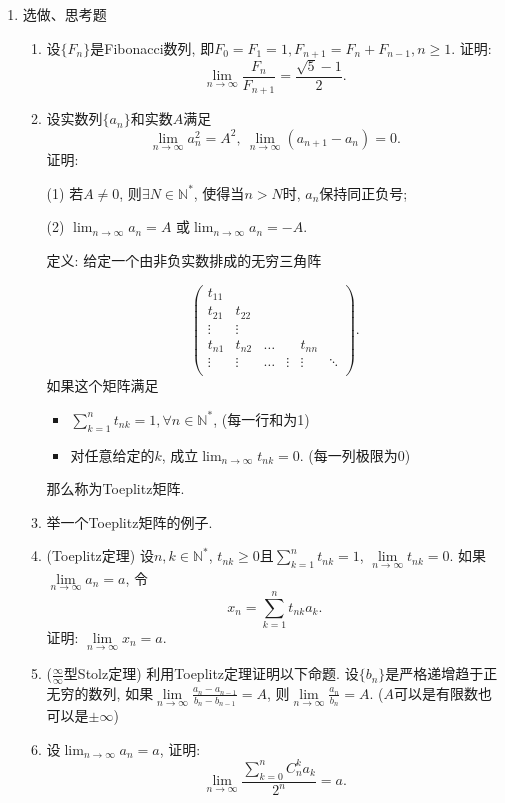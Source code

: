 \documentclass[UTF8,11pt, a4paper, oneside, fontset=none]{ctexbook}
\begin{document}
\begin{enumerate}
\item {\color{red} 选做、思考题}

\begin{enumerate}

\item 设$\{ F_n\}$是Fibonacci数列, 即$F_0 = F_1 =1, F_{n+1} = F_n + F_{n-1}, n \geq 1$. 证明: 
\[
\lim_{n \to \infty} \frac{F_n}{F_{n+1}} = \frac{\sqrt 5 -1}{2}.
\]

\item 设实数列$\{a_n\}$和实数$A$满足
\[
\lim_{n \to \infty} a_n^2 = A^2, \ \lim_{n \to \infty}(a_{n+1} - a_n) =0.
\]
证明: 

(1) 若$A \neq 0$, 则$\exists N \in \mathbb N^*$, 使得当$n >N$时, $a_n$保持同正负号;

(2) $\lim_{n \to \infty} a_n = A$ 或$\lim_{n \to \infty} a_n = -A$.

\noindent
{\color{purple} 定义}: 给定一个由非负实数排成的无穷三角阵

\[
\left( \begin{array}{ccccccc}
t_{11}      &  & & & &    \\
t_{21}      &t_{22} &  &  &   \\
\vdots      & \vdots     & &  &  &   \\
t_{n1}     & t_{n2}      & \hdots        &    & t_{nn} &    \\
\vdots & \vdots & \hdots       & \vdots       & \vdots   & \ddots  \\
\end{array} \right). 
\]
如果这个矩阵满足
\begin{itemize}
\item[(1)] $\sum_{k=1}^n t_{nk} =1, \forall n \in \mathbb N^*$, (每一行和为1)
\item[(2)] 对任意给定的$k$, 成立$\lim_{n \to \infty} t_{nk} =0$. (每一列极限为0)
\end{itemize}
那么称为Toeplitz矩阵. 

\item 举一个Toeplitz矩阵的例子.

\item (Toeplitz定理) 设$n, k \in \mathbb N^*$, $t_{nk} \geq 0$且$\sum_{k=1}^n t_{nk} =1$, $\lim\limits_{n \to \infty} t_{nk} =0$. 如果$\lim\limits_{n \to \infty} a_n =a$, 令
\[
x_n = \sum_{k=1}^n t_{nk} a_k.
\]
证明: $\lim\limits_{n \to \infty} x_n =a$.

\item ($\frac{\infty}{\infty}$型Stolz定理) 
利用Toeplitz定理证明以下命题. 设$\{b_n\}$是严格递增趋于正无穷的数列, 如果$\lim\limits_{n \to \infty} \frac{a_n - a_{n-1}}{b_n - b_{n-1}} =A$,
则$\lim\limits_{n \to \infty}\frac{a_n}{b_n} = A$. ($A$可以是有限数也可以是$\pm\infty$)

\item 设$\lim_{n \to \infty} a_n =a$, 证明:
\[
\lim_{n \to \infty} \frac{\sum_{k=0}^n C_n^k a_k}{2^n} =a.
\]

\end{enumerate}

\end{enumerate}
\end{document}
